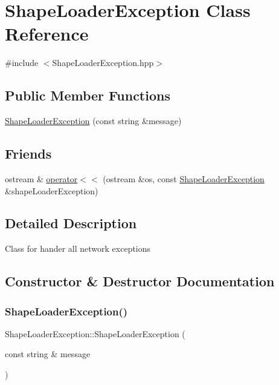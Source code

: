 \hypertarget{class_shape_loader_exception}{}\section{Shape\+Loader\+Exception Class Reference}
\label{class_shape_loader_exception}


{\ttfamily \#include $<$Shape\+Loader\+Exception.\+hpp$>$}

\subsection*{Public Member Functions}
\begin{DoxyCompactItemize}
\item 
\hyperlink{class_shape_loader_exception_abafaa24f3865b9a1bc5a0c3b4ffb62b5}{Shape\+Loader\+Exception} (const string \&message)
\end{DoxyCompactItemize}
\subsection*{Friends}
\begin{DoxyCompactItemize}
\item 
ostream \& \hyperlink{class_shape_loader_exception_aaeb686a05fcc919d9b383b9f61182f44}{operator$<$$<$} (ostream \&os, const \hyperlink{class_shape_loader_exception}{Shape\+Loader\+Exception} \&shape\+Loader\+Exception)
\end{DoxyCompactItemize}


\subsection{Detailed Description}
Class for hander all network exceptions 

\subsection{Constructor \& Destructor Documentation}
\hypertarget{class_shape_loader_exception_abafaa24f3865b9a1bc5a0c3b4ffb62b5}{}\label{class_shape_loader_exception_abafaa24f3865b9a1bc5a0c3b4ffb62b5} 
\subsubsection{\texorpdfstring{Shape\+Loader\+Exception()}{ShapeLoaderException()}}
{\footnotesize\ttfamily Shape\+Loader\+Exception\+::\+Shape\+Loader\+Exception (\begin{DoxyParamCaption}\item[{const string \&}]{message }\end{DoxyParamCaption})}

